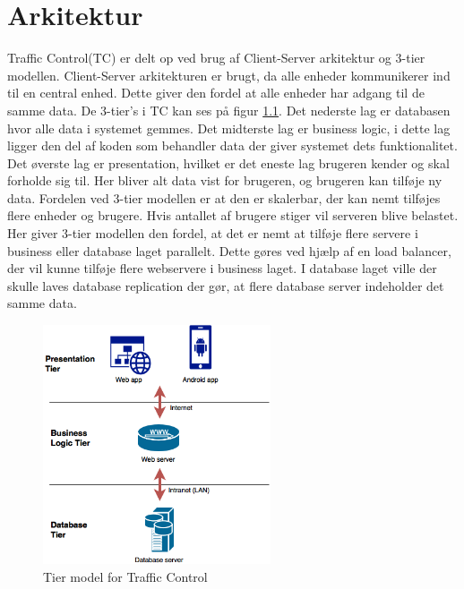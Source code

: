 \chapter{Arkitektur} 
Traffic Control(TC) er delt op ved brug af Client-Server arkitektur og 3-tier modellen. 
\newline
Client-Server arkitekturen er brugt, da alle enheder kommunikerer ind til en central enhed. Dette giver den fordel at alle enheder har adgang til de samme data.
\newline
De 3-tier's i TC kan ses på figur \ref{fig:TierModel}. Det nederste lag er databasen hvor alle data i systemet gemmes. Det midterste lag er business logic, i dette lag ligger den del af koden som behandler data der giver systemet dets funktionalitet. Det øverste lag er presentation, hvilket er det eneste lag brugeren kender og skal forholde sig til. Her bliver alt data vist for brugeren, og brugeren kan tilføje ny data. 
\newline
Fordelen ved 3-tier modellen er at den er skalerbar, der kan nemt tilføjes flere enheder og brugere.
\newline 
Hvis antallet af brugere stiger vil serveren blive belastet. Her giver 3-tier modellen den fordel, at det er nemt at tilføje flere servere i business eller database laget parallelt. 
Dette gøres ved hjælp af en load balancer, der vil kunne tilføje flere webservere i business laget. I database laget ville der skulle laves database replication der gør, at flere database server indeholder det samme data.

\begin{figure}[htbp] %
	\centering
	\includegraphics[width=0.6\textwidth]{../Dokumentation/Arkitektur/Tier.png}
	\caption{Tier model for Traffic Control}
	\label{fig:TierModel}
\end{figure}
\clearpage

